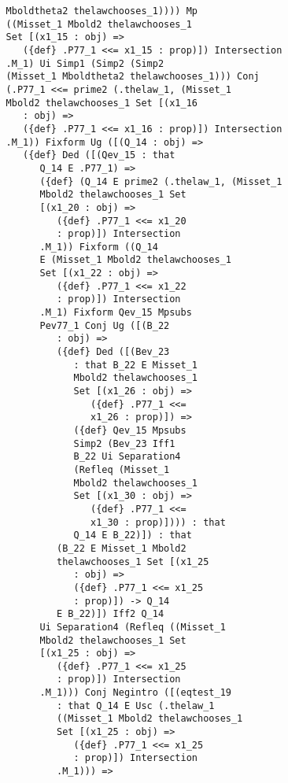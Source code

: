 \documentclass[12pt]{article}
\begin{document}
\begin{verbatim}
          Mboldtheta2 thelawchooses_1)))) Mp 
          ((Misset_1 Mbold2 thelawchooses_1 
          Set [(x1_15 : obj) => 
             ({def} .P77_1 <<= x1_15 : prop)]) Intersection 
          .M_1) Ui Simp1 (Simp2 (Simp2 
          (Misset_1 Mboldtheta2 thelawchooses_1))) Conj 
          (.P77_1 <<= prime2 (.thelaw_1, (Misset_1 
          Mbold2 thelawchooses_1 Set [(x1_16 
             : obj) => 
             ({def} .P77_1 <<= x1_16 : prop)]) Intersection 
          .M_1)) Fixform Ug ([(Q_14 : obj) => 
             ({def} Ded ([(Qev_15 : that 
                Q_14 E .P77_1) => 
                ({def} (Q_14 E prime2 (.thelaw_1, (Misset_1 
                Mbold2 thelawchooses_1 Set 
                [(x1_20 : obj) => 
                   ({def} .P77_1 <<= x1_20 
                   : prop)]) Intersection 
                .M_1)) Fixform ((Q_14 
                E (Misset_1 Mbold2 thelawchooses_1 
                Set [(x1_22 : obj) => 
                   ({def} .P77_1 <<= x1_22 
                   : prop)]) Intersection 
                .M_1) Fixform Qev_15 Mpsubs 
                Pev77_1 Conj Ug ([(B_22 
                   : obj) => 
                   ({def} Ded ([(Bev_23 
                      : that B_22 E Misset_1 
                      Mbold2 thelawchooses_1 
                      Set [(x1_26 : obj) => 
                         ({def} .P77_1 <<= 
                         x1_26 : prop)]) => 
                      ({def} Qev_15 Mpsubs 
                      Simp2 (Bev_23 Iff1 
                      B_22 Ui Separation4 
                      (Refleq (Misset_1 
                      Mbold2 thelawchooses_1 
                      Set [(x1_30 : obj) => 
                         ({def} .P77_1 <<= 
                         x1_30 : prop)]))) : that 
                      Q_14 E B_22)]) : that 
                   (B_22 E Misset_1 Mbold2 
                   thelawchooses_1 Set [(x1_25 
                      : obj) => 
                      ({def} .P77_1 <<= x1_25 
                      : prop)]) -> Q_14 
                   E B_22)]) Iff2 Q_14 
                Ui Separation4 (Refleq ((Misset_1 
                Mbold2 thelawchooses_1 Set 
                [(x1_25 : obj) => 
                   ({def} .P77_1 <<= x1_25 
                   : prop)]) Intersection 
                .M_1))) Conj Negintro ([(eqtest_19 
                   : that Q_14 E Usc (.thelaw_1 
                   ((Misset_1 Mbold2 thelawchooses_1 
                   Set [(x1_25 : obj) => 
                      ({def} .P77_1 <<= x1_25 
                      : prop)]) Intersection 
                   .M_1))) => 

\end{verbatim}
\end{document}

